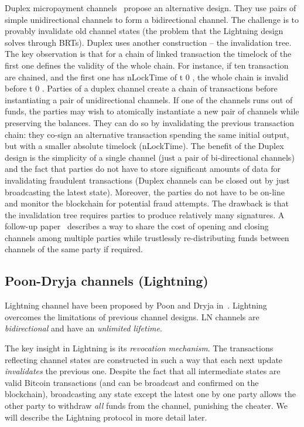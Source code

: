 Duplex micropayment channels~\cite{DBLP:conf/sss/DeckerW15} propose an alternative design.
They use pairs of simple unidirectional channels to form a bidirectional channel.
The challenge is to provably invalidate old channel states (the problem that the Lightning design solves through BRTs).
Duplex uses another construction -- the invalidation tree.
The key observation is that for a chain of linked transaction the timelock of the first one defines the validity of the whole chain.
For instance, if ten transaction are chained, and the first one has nLockTime of t 0 , the whole chain is invalid before t 0 .
Parties of a duplex channel create a chain of transactions before instantiating a pair of unidirectional channels. If one of the channels runs out of funds, the parties may wish to atomically instantiate a new pair of channels while preserving the balances.
They can do so by invalidating the previous transaction chain: they co-sign an alternative transaction spending the same initial output, but with a smaller absolute timelock (nLockTime).
The benefit of the Duplex design is the simplicity of a single channel (just a pair of bi-directional channels) and the fact that parties do not have to store significant amounts of data for invalidating fraudulent transactions (Duplex channels can be closed out by just broadcasting the latest state).
Moreover, the parties do not have to be on-line and monitor the blockchain for potential fraud attempts.
The drawback is that the invalidation tree requires parties to produce relatively many signatures.
A follow-up paper~\cite{DBLP:conf/sss/BurchertDW17} describes a way to share the cost of opening and closing channels among multiple parties while trustlessly re-distributing funds between channels of the same party if required.


\subsection{Poon-Dryja channels (Lightning)}

Lightning channel have been proposed by Poon and Dryja in~\cite{Poon2016}.
Lightning overcomes the limitations of previous channel designs.
LN channels are \textit{bidirectional} and have an \textit{unlimited lifetime}.

The key insight in Lightning is its \textit{revocation mechanism}.
The transactions reflecting channel states are constructed in such a way that each next update \textit{invalidates} the previous one.
Despite the fact that all intermediate states are valid Bitcoin transactions (and can be broadcast and confirmed on the blockchain), broadcasting any state except the latest one by one party allows the other party to withdraw \textit{all} funds from the channel, punishing the cheater.
We will describe the Lightning protocol in more detail later.

